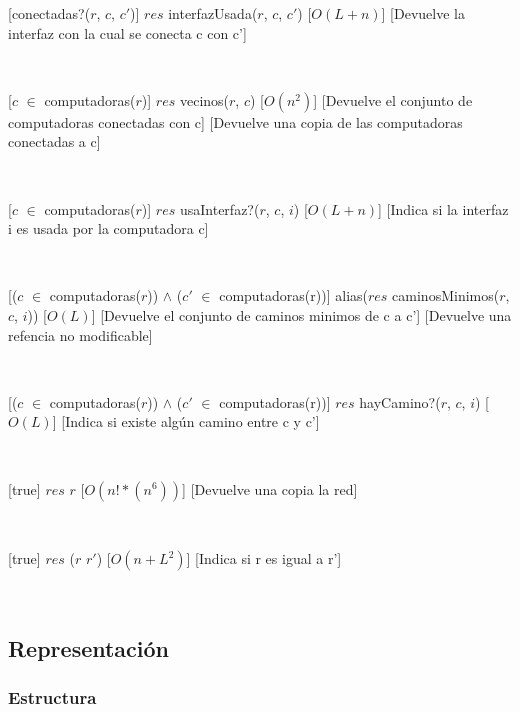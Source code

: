   [conectadas?($r$, $c$, $c'$)]
  {$res$ \igobs interfazUsada($r$, $c$, $c'$)}
  [$O(L + n)$]
  [Devuelve la interfaz con la cual se conecta c con c']

  ~

  [$c$ $\in$ computadoras($r$)]
  {$res$ \igobs vecinos($r$, $c$)}
  [$O(n^2)$]
  [Devuelve el conjunto de computadoras conectadas con c]
  [Devuelve una copia de las computadoras conectadas a c]

  ~

  [$c$ $\in$ computadoras($r$)]
  {$res$ \igobs usaInterfaz?($r$, $c$, $i$)}
  [$O(L + n)$]
  [Indica si la interfaz i es usada por la computadora c]

  ~

  [($c$ $\in$ computadoras($r$)) $\land$ ($c'$ $\in$ computadoras(r))]
  {alias($res$ \igobs caminosMinimos($r$, $c$, $i$))}
  [$O(L)$]
  [Devuelve el conjunto de caminos minimos de c a c']
  [Devuelve una refencia no modificable]


  ~

  [($c$ $\in$ computadoras($r$)) $\land$ ($c'$ $\in$ computadoras(r))]
  {$res$ \igobs hayCamino?($r$, $c$, $i$)}
  [$O(L)$]
  [Indica si existe algún camino entre c y c']

  ~

  [true]
  {$res$ \igobs $r$}
  [$O(n!*(n^6))$]
  [Devuelve una copia la red]

  ~

  [true]
  {$res$ \igobs ($r$ \igobs $r'$)}
  [$O(n +L^2)$]
  [Indica si r es igual a r']

  ~


\subsection{Representación}

  \subsubsection{Estructura}

